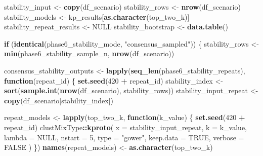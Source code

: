 \documentclass[
]{article}
\newenvironment{Shaded}{\begin{snugshade}}{\end{snugshade}}
\newcommand{\AttributeTok}[1]{\textcolor[rgb]{0.13,0.29,0.53}{#1}}
\newcommand{\ConstantTok}[1]{\textcolor[rgb]{0.56,0.35,0.01}{#1}}
\newcommand{\ControlFlowTok}[1]{\textcolor[rgb]{0.13,0.29,0.53}{\textbf{#1}}}
\newcommand{\DecValTok}[1]{\textcolor[rgb]{0.00,0.00,0.81}{#1}}
\newcommand{\FunctionTok}[1]{\textcolor[rgb]{0.13,0.29,0.53}{\textbf{#1}}}
\newcommand{\NormalTok}[1]{#1}
\newcommand{\OtherTok}[1]{\textcolor[rgb]{0.56,0.35,0.01}{#1}}
\newcommand{\SpecialCharTok}[1]{\textcolor[rgb]{0.81,0.36,0.00}{\textbf{#1}}}
\newcommand{\StringTok}[1]{\textcolor[rgb]{0.31,0.60,0.02}{#1}}
\begin{document}
\begin{Shaded}
\begin{Highlighting}[]
\NormalTok{stability\_input }\OtherTok{\textless{}{-}} \FunctionTok{copy}\NormalTok{(df\_scenario)}
\NormalTok{stability\_rows }\OtherTok{\textless{}{-}} \FunctionTok{nrow}\NormalTok{(df\_scenario)}
\NormalTok{stability\_models }\OtherTok{\textless{}{-}}\NormalTok{ kp\_results[}\FunctionTok{as.character}\NormalTok{(top\_two\_k)]}
\NormalTok{stability\_repeat\_results }\OtherTok{\textless{}{-}} \ConstantTok{NULL}
\NormalTok{stability\_bootstrap }\OtherTok{\textless{}{-}} \FunctionTok{data.table}\NormalTok{()}

\ControlFlowTok{if}\NormalTok{ (}\FunctionTok{identical}\NormalTok{(phase6\_stability\_mode, }\StringTok{"consensus\_sampled"}\NormalTok{)) \{}
\NormalTok{  stability\_rows }\OtherTok{\textless{}{-}} \FunctionTok{min}\NormalTok{(phase6\_stability\_sample\_n, }\FunctionTok{nrow}\NormalTok{(df\_scenario))}

\NormalTok{  consensus\_stability\_outputs }\OtherTok{\textless{}{-}} \FunctionTok{lapply}\NormalTok{(}\FunctionTok{seq\_len}\NormalTok{(phase6\_stability\_repeats), }\ControlFlowTok{function}\NormalTok{(repeat\_id) \{}
      \FunctionTok{set.seed}\NormalTok{(}\DecValTok{420} \SpecialCharTok{+}\NormalTok{ repeat\_id)}
\NormalTok{      stability\_index }\OtherTok{\textless{}{-}} \FunctionTok{sort}\NormalTok{(}\FunctionTok{sample.int}\NormalTok{(}\FunctionTok{nrow}\NormalTok{(df\_scenario), stability\_rows))}
\NormalTok{      stability\_input\_repeat }\OtherTok{\textless{}{-}} \FunctionTok{copy}\NormalTok{(df\_scenario[stability\_index])}

\NormalTok{      repeat\_models }\OtherTok{\textless{}{-}} \FunctionTok{lapply}\NormalTok{(top\_two\_k, }\ControlFlowTok{function}\NormalTok{(k\_value) \{}
        \FunctionTok{set.seed}\NormalTok{(}\DecValTok{420} \SpecialCharTok{+}\NormalTok{ repeat\_id)}
\NormalTok{        clustMixType}\SpecialCharTok{::}\FunctionTok{kproto}\NormalTok{(}
          \AttributeTok{x =}\NormalTok{ stability\_input\_repeat,}
          \AttributeTok{k =}\NormalTok{ k\_value,}
          \AttributeTok{lambda =} \ConstantTok{NULL}\NormalTok{,}
          \AttributeTok{nstart =} \DecValTok{5}\NormalTok{,}
          \AttributeTok{type =} \StringTok{"gower"}\NormalTok{,}
          \AttributeTok{keep.data =} \ConstantTok{TRUE}\NormalTok{,}
          \AttributeTok{verbose =} \ConstantTok{FALSE}
\NormalTok{        )}
\NormalTok{      \})}
      \FunctionTok{names}\NormalTok{(repeat\_models) }\OtherTok{\textless{}{-}} \FunctionTok{as.character}\NormalTok{(top\_two\_k)}


\end{Highlighting}
\end{Shaded}
\end{document}
